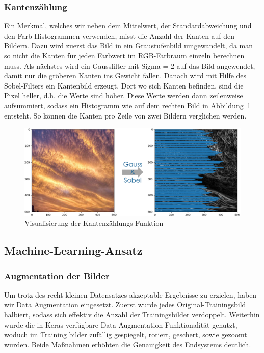 \documentclass[a4,german]{article}
\begin{document}
\subsubsection{Kantenzählung}
\label{sec:kanten}
Ein Merkmal, welches wir neben dem Mittelwert, der Standardabweichung und den Farb-Histogrammen verwenden, misst die Anzahl der Kanten auf den Bildern.
Dazu wird zuerst das Bild in ein Graustufenbild umgewandelt, da man so nicht die Kanten für jeden Farbwert im RGB-Farbraum einzeln berechnen muss. Als nächstes wird ein Gaussfilter mit Sigma = 2 auf das Bild angewendet, damit nur die gröberen Kanten ins Gewicht fallen. Danach wird mit Hilfe des Sobel-Filters ein Kantenbild erzeugt.
Dort wo sich Kanten befinden, sind die Pixel heller, d.h. die Werte sind höher.
Diese Werte werden dann zeilenweise aufsummiert, sodass ein Histogramm wie auf dem rechten Bild in Abbildung~\ref{fig:kaz} entsteht. So können die Kanten pro Zeile von zwei Bildern verglichen werden.

\begin{figure}[h!]
\centering
\includegraphics[width=\textwidth]{Kantenzaehlung.png}
\caption{Visualisierung der Kantenzählungs-Funktion}
    \label{fig:kaz}
\end{figure}


\subsection{Machine-Learning-Ansatz}

\subsubsection{Augmentation der Bilder}
\label{sec:augmentation}

Um trotz des recht kleinen Datensatzes akzeptable Ergebnisse zu erzielen, haben wir Data Augmentation eingesetzt.
Zuerst wurde jedes Original-Trainingsbild halbiert, sodass sich effektiv die Anzahl der Trainingsbilder verdoppelt.
Weiterhin wurde die in Keras verfügbare Data-Augmentation-Funktionalität genutzt, woduch im Training bilder zufällig gespiegelt, rotiert, geschert, sowie gezoomt wurden.
Beide Maßnahmen erhöhten die Genauigkeit des Endsystems deutlich.
\end{document}

